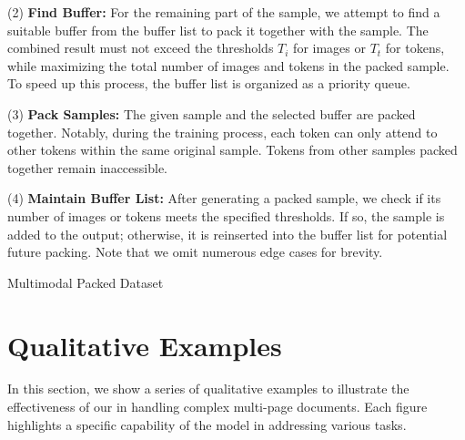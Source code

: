 (2) \textbf{Find Buffer:} For the remaining part of the sample, we attempt to find a suitable buffer from the buffer list to pack it together with the sample. The combined result must not exceed the thresholds $T_i$ for images or $T_t$ for tokens, while maximizing the total number of images and tokens in the packed sample. To speed up this process, the buffer list is organized as a priority queue.

(3) \textbf{Pack Samples:} The given sample and the selected buffer are packed together. Notably, during the training process, each token can only attend to other tokens within the same original sample. Tokens from other samples packed together remain inaccessible.

(4) \textbf{Maintain Buffer List:} After generating a packed sample, we check if its number of images or tokens meets the specified thresholds. If so, the sample is added to the output; otherwise, it is reinserted into the buffer list for potential future packing.
Note that we omit numerous edge cases for brevity.

\begin{algorithm}
	\caption{Multimodal Packed Dataset} 
	\label{alg:packed_dataset} 



\end{algorithm}


\section{Qualitative Examples}

In this section, we show a series of qualitative examples to illustrate the effectiveness of our \modelname in handling complex multi-page documents. Each figure highlights a specific capability of the model in addressing various tasks.

